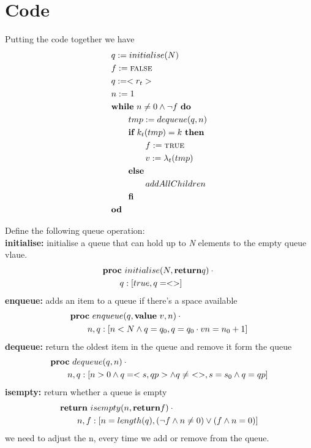 \documentclass[headings=small,a4paper,12pt]{scrartcl}
\begin{document}
\section{Code}
\label{sec:code}
Putting the code together we have
\begin{align}
    &q\mathrel{:=} initialise(N)\\
    &f\mathrel{:=} \text{\textsc{false}}\\
    &q\mathrel{:=} <r_t>\\
    &n\mathrel{:=} 1\\
    &\text{\normalfont\bfseries while}~n \ne 0\wedge \neg f~\text{\normalfont\bfseries do}\\
    &\qquad tmp\mathrel{:=} dequeue(q,n)\\
    &\qquad \text{\normalfont\bfseries if}~k_t(tmp) = k~\text{\normalfont\bfseries then}\\
    &\qquad\qquad f\mathrel{:=} \text{\textsc{true}}\\
    &\qquad\qquad v\mathrel{:=} \lambda_t(tmp)\\
    &\qquad \text{\normalfont\bfseries else}\\
    &\qquad\qquad addAllChildren\\
    &\qquad\text{\normalfont\bfseries fi}\\
    &\text{\normalfont\bfseries od}
\end{align}

Define the following queue operation:\\
\textbf{initialise:} initialise a queue that can hold up to \textit{N} elements to the empty queue vlaue.
\begin{align*}
  &\text{\normalfont\bfseries proc}~initialise(N,\text{\normalfont\bfseries return} q)\cdot{}\\
  &\qquad q :[true, q = <>]\\
\end{align*}
\break
\textbf{enqueue:} adds an item to a queue if there's a space available 
\begin{align*}
  &\text{\normalfont\bfseries proc}~enqueue(q, \text{\normalfont\bfseries value}~v,n)\cdot{}\\
    &\qquad n,q:[n<N \wedge q=q_0,q=q_0\cdot{}v n = n_0 + 1]\\
\end{align*}
%
\textbf{dequeue:} return the oldest item in the queue and remove it form the queue\\
\begin{align*}
    &\text{\normalfont\bfseries proc}~dequeue(q, n)\cdot{}\\
    &\qquad n,q:[n>0\wedge q=<s,qp>\wedge q\ne~<>, s= s_0\wedge q = qp] 
\end{align*}
\break
\textbf{isempty:} return whether a queue is empty
\begin{align*}
  &\text{\normalfont\bfseries return}~isempty(n, \text{\normalfont\bfseries return} f)\cdot{}\\
    &\qquad {n,f:[n = length(q) ,(\neg f \wedge n \neq 0)\vee(f \wedge n = 0)]}\\
\end{align*}
\break
we need to adjust the n, every time we add or remove from the queue.\\
\end{document}
